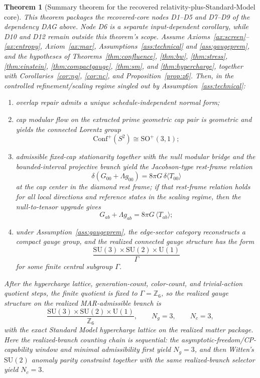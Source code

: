 \documentclass[11pt]{article}
\newtheorem{theorem}{Theorem}[section]
\newcommand{\SU}{\mathrm{SU}}
\newcommand{\U}{\mathrm{U}}
\newcommand{\Conf}{\mathrm{Conf}}
\begin{document}
\begin{theorem}[Summary theorem for the recovered relativity-plus-Standard-Model core]\label{thm:master}
This theorem packages the recovered-core nodes D1--D5 and D7--D9 of the dependency DAG above. Node D6 is a separate input-dependent corollary, while D10 and D12 remain outside this theorem's scope. Assume Axioms~\ref{ax:screen}--\ref{ax:entropy}, Axiom~\ref{ax:mar}, Assumptions~\ref{ass:technical} and \ref{ass:gaugeprem}, and the hypotheses of Theorems~\ref{thm:confluence}, \ref{thm:bw}, \ref{thm:stress}, \ref{thm:einstein}, \ref{thm:compactgauge}, \ref{thm:sm}, and \ref{thm:hypercharge}, together with Corollaries~\ref{cor:ng}, \ref{cor:nc}, and Proposition~\ref{prop:z6}. Then, in the controlled refinement/scaling regime singled out by Assumption~\ref{ass:technical}:
\begin{enumerate}[label=(\roman*),leftmargin=2em]
\item overlap repair admits a unique schedule-independent normal form;
\item cap modular flow on the extracted prime geometric cap pair is geometric and yields the connected Lorentz group
\[
\Conf^+(S^2)\cong \mathrm{SO}^+(3,1);
\]
\item admissible fixed-cap stationarity together with the null modular bridge and the bounded-interval projective branch yield the Jacobson-type rest-frame relation
\[
\delta\!\left(G_{00}+\Lambda g_{00}\right)=8\pi G\,\delta\langle T_{00}\rangle
\]
at the cap center in the diamond rest frame; if that rest-frame relation holds for all local directions and reference states in the scaling regime, then the null-to-tensor upgrade gives
\[
G_{ab}+\Lambda g_{ab}=8\pi G\,\langle T_{ab}\rangle;
\]
\item under Assumption~\ref{ass:gaugeprem}, the edge-sector category reconstructs a compact gauge group, and the realized connected gauge structure has the form
\[
\frac{\SU(3)\times\SU(2)\times\U(1)}{\Gamma}
\]
for some finite central subgroup \(\Gamma\).
\end{enumerate}
After the hypercharge lattice, generation-count, color-count, and trivial-action quotient steps, the finite quotient is fixed to \(\Gamma=\mathbb Z_6\), so the realized gauge structure on the realized MAR-admissible branch is
\[
\frac{\SU(3)\times\SU(2)\times\U(1)}{\mathbb Z_6},
\qquad
N_g=3,
\qquad
N_c=3,
\]
with the exact Standard Model hypercharge lattice on the realized matter package. Here the realized-branch counting chain is sequential: the asymptotic-freedom/CP-capability window and minimal admissibility first yield \(N_g=3\), and then Witten's \(\SU(2)\) anomaly parity constraint together with the same realized-branch selector yield \(N_c=3\).
\end{theorem}
\end{document}
